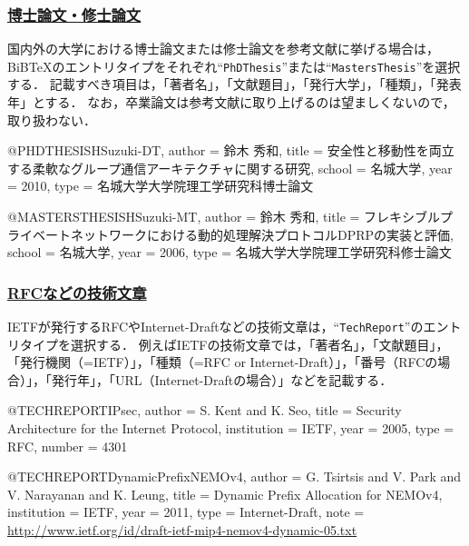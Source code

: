 \documentclass[a4j,11pt]{ujreport}
\begin{document}
\subsubsection{\underline{博士論文・修士論文}}
国内外の大学における博士論文または修士論文を参考文献に挙げる場合は，BiB{\TeX}のエントリタイプをそれぞれ``\texttt{PhDThesis}''または``\texttt{MastersThesis}''を選択する．
記載すべき項目は，「著者名」，「文献題目」，「発行大学」，「種類」，「発表年」とする．
なお，卒業論文は参考文献に取り上げるのは望ましくないので，取り扱わない．

\begin{code}
@PHDTHESIS{HSuzuki-DT,
  author = {鈴木 秀和},
  title = {安全性と移動性を両立する柔軟なグループ通信アーキテクチャに関する研究},
  school = {名城大学},
  year = {2010},
  type = {名城大学大学院理工学研究科博士論文}
}
\end{code}

\begin{code}
@MASTERSTHESIS{HSuzuki-MT,
  author = {鈴木 秀和},
  title = {フレキシブルプライベートネットワークにおける動的処理解決プロトコルDPRPの実装と評価},
  school = {名城大学},
  year = {2006},
  type = {名城大学大学院理工学研究科修士論文}
}
\end{code}

\subsubsection{\underline{RFCなどの技術文章}}
IETFが発行するRFCやInternet-Draftなどの技術文章は，``\texttt{TechReport}''のエントリタイプを選択する．
例えばIETFの技術文章では，「著者名」，「文献題目」，「発行機関（=IETF）」，「種類（=RFC or Internet-Draft）」，「番号（RFCの場合）」，「発行年」，「URL（Internet-Draftの場合）」などを記載する．

\begin{code}
@TECHREPORT{IPsec,
  author = {S. Kent and K. Seo},
  title = {Security Architecture for the Internet Protocol},
  institution = {IETF},
  year = {2005},
  type = {RFC},
  number = {4301}
}
\end{code}

\begin{code}
@TECHREPORT{DynamicPrefixNEMOv4,
  author = {G. Tsirtsis and V. Park and V. Narayanan and K. Leung},
  title = {Dynamic Prefix Allocation for NEMOv4},
  institution = {IETF},
  year = {2011},
  type = {Internet-Draft},
  note = {\url{http://www.ietf.org/id/draft-ietf-mip4-nemov4-dynamic-05.txt}}
}
\end{code}
\end{document}
